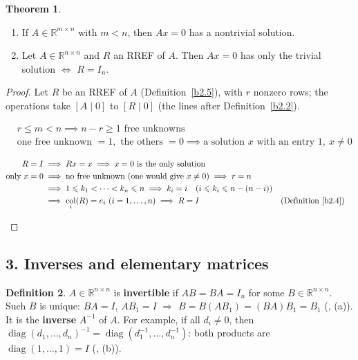 \documentclass[12pt]{article}
\newcommand{\R}{\mathbb R}
\DeclareMathOperator{\col}{col}
\DeclareMathOperator{\diag}{diag}
\theoremstyle{definition}
\newtheorem{theorem}{Theorem}
\newtheorem{definition}[theorem]{Definition}
\newcommand{\boardtop}{\vspace*{-\abovedisplayskip}}
\begin{document}
\begin{theorem}\label{b2.11}
\begin{enumerate}
\item If \(A\in\R^{m\times n}\) with \(m<n\), then \(Ax=0\) has a nontrivial solution.
\item Let \(A\in\R^{n\times n}\) and \(R\) an RREF of \(A\). Then \(Ax=0\) has only the trivial solution \(\iff\)
\(R=I_n\).
\end{enumerate}
\end{theorem}
\begin{proof}
Let \(R\) be an RREF of \(A\) (Definition~\ref{b2.5}), with \(r\) nonzero rows; the operations take \([A\mid0]\) to
\([R\mid0]\) (the lines after Definition~\ref{b2.2}).
\begin{board}[(a) \(Ax=0\) is consistent (\(x=0\)); Proposition~\ref{b2.7}(b):]
\boardtop
\begin{align*}
&r\leqslant m<n\implies n-r\geqslant1\text{ free unknowns}\\
&\text{one free unknown }=1,\text{ the others }=0\implies\text{a solution }x\text{ with an entry }1,\ x\ne0
\end{align*}
\end{board}
\begin{board}
\boardtop
\begin{align*}
R=I&\implies Rx=x\implies x=0\text{ is the only solution}\\
\text{only }x=0&\implies\text{no free unknown (one would give \(x\ne0\))}\implies r=n\\
&\implies1\leqslant k_1<\dots<k_n\leqslant n\implies k_i=i\quad(i\leqslant k_i\leqslant n-(n-i))\\
&\implies\col_i(R)=e_i\ (i=1,\dots,n)\implies R=I&&\text{(Definition~\ref{b2.4})}
\end{align*}
\end{board}
\nopagebreak
\end{proof}

\subsection*{3. Inverses and elementary matrices}

\begin{definition}\label{b2.12}
\(A\in\R^{n\times n}\) is \textbf{invertible} if \(AB=BA=I_n\) for some \(B\in\R^{n\times n}\). Such \(B\) is unique:
\(BA=I\), \(AB_1=I\) \(\Rightarrow\) \(B=B(AB_1)=(BA)B_1=B_1\) (, (a)). It is the
\textbf{inverse} \(A^{-1}\) of \(A\). For example, if all \(d_i\ne0\), then
\(\diag(d_1,\dots,d_n)^{-1}=\diag(d_1^{-1},\dots,d_n^{-1})\): both products are \(\diag(1,\dots,1)=I\) (,
(b)).
\end{definition}
\end{document}
